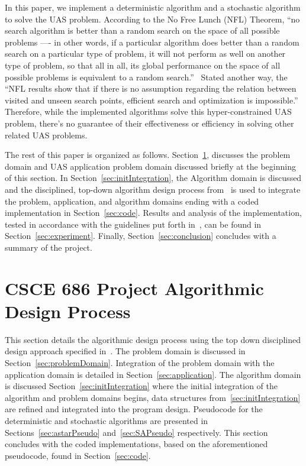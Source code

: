 \documentclass[conference]{IEEEtran}
\begin{document}
In this paper, we implement a deterministic algorithm and a stochastic
algorithm to solve the UAS problem. According to the No Free Lunch (NFL)
Theorem, ``no search algorithm is better than a random search on the space of
all possible problems —- in other words, if a particular algorithm does better
than a random search on a particular type of problem, it will not perform as
well on another type of problem, so that all in all, its global performance on
the space of all possible problems is equivalent to a random
search.''~\cite{collet2007, wiki:nfl} Stated another way, the ``NFL results
show that if there is no assumption regarding the relation between visited and
unseen search points, efficient search and optimization is
impossible.''~\cite{igel2014} Therefore, while the implemented algorithms solve
this hyper-constrained UAS problem, there's no guarantee of their effectiveness
or efficiency in solving other related UAS problems.

The rest of this paper is organized as follows.
Section~\ref{sec:designProcess}, discusses the problem domain and UAS
application problem domain discussed briefly at the beginning of this section.
In Section~\ref{sec:initIntegration}, the Algorithm domain is discussed and the
disciplined, top-down algorithm design process from~\cite{lamontDesign,
lamontSCP, lamontMIS} is used to integrate the problem, application, and
algorithm domains ending with a coded implementation in Section~\ref{sec:code}.
Results and analysis of the implementation, tested in accordance with the
guidelines put forth in~\cite{barr2001}, can be found in
Section~\ref{sec:experiment}. Finally, Section~\ref{sec:conclusion} concludes
with a summary of the project.

\section{CSCE 686 Project Algorithmic Design Process} \label{sec:designProcess}


This section details the algorithmic design process using the top down
disciplined design approach specified in~\cite{lamontDesign, lamontSCP}. The
problem domain is discussed in Section~\ref{sec:problemDomain}. Integration of
the problem domain with the application domain is detailed in
Section~\ref{sec:application}. The algorithm domain is discussed
Section~\ref{sec:initIntegration} where the initial integration of the
algorithm and problem domains begins, data structures
from~\ref{sec:initIntegration} are refined and integrated into the program
design.  Pseudocode for the deterministic and stochastic algorithms are
presented in Sections~\ref{sec:astarPseudo} and~\ref{sec:SAPseudo}
respectively. This section concludes with the coded implementations, based on
the aforementioned pseudocode, found in Section~\ref{sec:code}.
\end{document}
